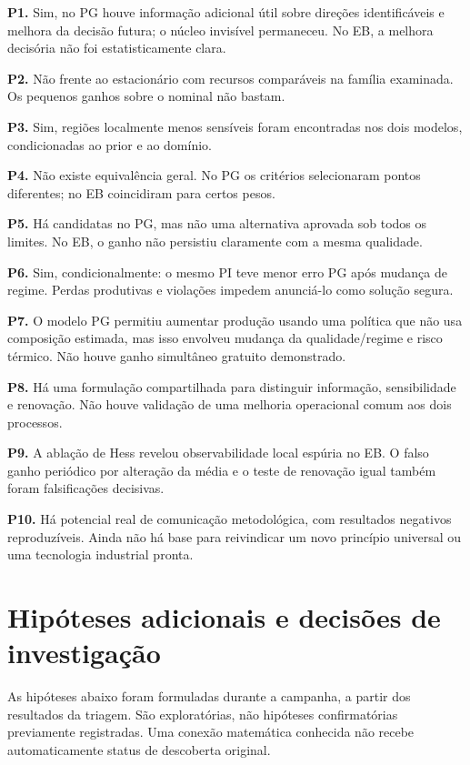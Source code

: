 \documentclass[
  11pt,
  letterpaper,
]{article}
\begin{document}
\textbf{P1.} Sim, no PG houve informação adicional útil sobre direções
identificáveis e melhora da decisão futura; o núcleo invisível
permaneceu. No EB, a melhora decisória não foi estatisticamente clara.

\textbf{P2.} Não frente ao estacionário com recursos comparáveis na
família examinada. Os pequenos ganhos sobre o nominal não bastam.

\textbf{P3.} Sim, regiões localmente menos sensíveis foram encontradas
nos dois modelos, condicionadas ao prior e ao domínio.

\textbf{P4.} Não existe equivalência geral. No PG os critérios
selecionaram pontos diferentes; no EB coincidiram para certos pesos.

\textbf{P5.} Há candidatas no PG, mas não uma alternativa aprovada sob
todos os limites. No EB, o ganho não persistiu claramente com a mesma
qualidade.

\textbf{P6.} Sim, condicionalmente: o mesmo PI teve menor erro PG após
mudança de regime. Perdas produtivas e violações impedem anunciá-lo como
solução segura.

\textbf{P7.} O modelo PG permitiu aumentar produção usando uma política
que não usa composição estimada, mas isso envolveu mudança da
qualidade/regime e risco térmico. Não houve ganho simultâneo gratuito
demonstrado.

\textbf{P8.} Há uma formulação compartilhada para distinguir informação,
sensibilidade e renovação. Não houve validação de uma melhoria
operacional comum aos dois processos.

\textbf{P9.} A ablação de Hess revelou observabilidade local espúria no
EB. O falso ganho periódico por alteração da média e o teste de
renovação igual também foram falsificações decisivas.

\textbf{P10.} Há potencial real de comunicação metodológica, com
resultados negativos reproduzíveis. Ainda não há base para reivindicar
um novo princípio universal ou uma tecnologia industrial pronta.

\hypertarget{hipuxf3teses-adicionais-e-decisuxf5es-de-investigauxe7uxe3o}{%
\section{Hipóteses adicionais e decisões de
investigação}\label{hipuxf3teses-adicionais-e-decisuxf5es-de-investigauxe7uxe3o}}

As hipóteses abaixo foram formuladas durante a campanha, a partir dos
resultados da triagem. São exploratórias, não hipóteses confirmatórias
previamente registradas. Uma conexão matemática conhecida não recebe
automaticamente status de descoberta original.
\end{document}
